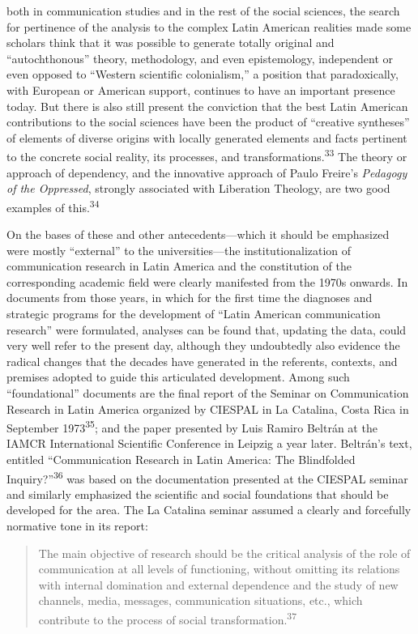 \documentclass{tufte-handout}
\begin{document}
both in communication studies and in the rest of the social sciences,
the search for pertinence of the analysis to the complex Latin American
realities made some scholars think that it was possible to generate
totally original and ``autochthonous'' theory, methodology, and even
epistemology, independent or even opposed to ``Western scientific
colonialism,'' a position that paradoxically, with European or American
support, continues to have an important presence today. But there is
also still present the conviction that the best Latin American
contributions to the social sciences have been the product of ``creative
syntheses'' of elements of diverse origins with locally generated
elements and facts pertinent to the concrete social reality, its
processes, and transformations.\textsuperscript{33} The theory or approach of dependency, and the
innovative approach of Paulo Freire's \emph{Pedagogy of the Oppressed},
strongly associated with Liberation Theology, are two good examples of
this.\textsuperscript{34}

On the bases of these and other antecedents---which it should be
emphasized were mostly ``external'' to the universities---the
institutionalization of communication research in Latin America and the
constitution of the corresponding academic field were clearly manifested
from the 1970s onwards. In documents from those years, in which for the
first time the diagnoses and strategic programs for the development of
``Latin American communication research'' were formulated, analyses can
be found that, updating the data, could very well refer to the present
day, although they undoubtedly also evidence the radical changes that
the decades have generated in the referents, contexts, and premises
adopted to guide this articulated development. Among such
``foundational'' documents are the final report of the Seminar on
Communication Research in Latin America organized by CIESPAL in La
Catalina, Costa Rica in September 1973\textsuperscript{35}; and the paper presented
by Luis Ramiro Beltrán at the IAMCR International Scientific Conference
in Leipzig a year later. Beltrán's text, entitled ``Communication
Research in Latin America: The Blindfolded Inquiry?''\textsuperscript{36}
was based on the documentation presented at the CIESPAL seminar and
similarly emphasized the scientific and social foundations that should
be developed for the area. The La Catalina seminar assumed a clearly and
forcefully normative tone in its report:

\begin{quote}
The main objective of research should be the critical analysis of the
role of communication at all levels of functioning, without omitting its
relations with internal domination and external dependence and the study
of new channels, media, messages, communication situations, etc., which
contribute to the process of social transformation.\textsuperscript{37}
\end{quote}
\end{document}
